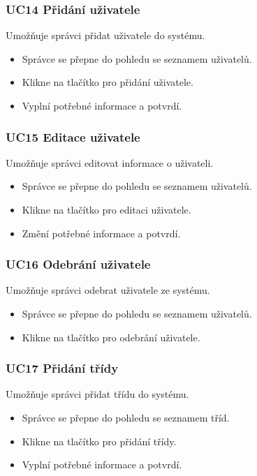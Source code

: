 \subsubsection*{UC14 Přidání uživatele}
Umožňuje správci přidat uživatele do systému. 
\begin{itemize}
    \item Správce se přepne do pohledu se seznamem uživatelů.
    \item Klikne na tlačítko pro přidání uživatele.
    \item Vyplní potřebné informace a potvrdí.
\end{itemize}

\subsubsection*{UC15 Editace uživatele}
Umožňuje správci editovat informace o uživateli.
\begin{itemize}
    \item Správce se přepne do pohledu se seznamem uživatelů.
    \item Klikne na tlačítko pro editaci uživatele.
    \item Změní potřebné informace a potvrdí.
\end{itemize}

\subsubsection*{UC16 Odebrání uživatele}
Umožňuje správci odebrat uživatele ze systému. 
\begin{itemize}
    \item Správce se přepne do pohledu se seznamem uživatelů.
    \item Klikne na tlačítko pro odebrání uživatele.
\end{itemize}

\subsubsection*{UC17 Přidání třídy}
Umožňuje správci přidat třídu do systému. 
\begin{itemize}
    \item Správce se přepne do pohledu se seznamem tříd.
    \item Klikne na tlačítko pro přidání třídy.
    \item Vyplní potřebné informace a potvrdí.
\end{itemize}

